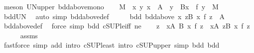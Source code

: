 \begin{isabellebody}
\ {\isacharparenleft}{\kern0pt}meson\ UN{\isacharunderscore}{\kern0pt}upper\ bdd{\isacharunderscore}{\kern0pt}above{\isacharunderscore}{\kern0pt}mono{\isacharparenright}{\kern0pt}\isanewline
\ \ \isamarkupfalse%
\ M\ \ {\isachardoublequoteopen}{\isasymAnd}x\ y{\isachardot}{\kern0pt}\ x\ {\isasymin}\ A\ {\isasymLongrightarrow}\ y\ {\isasymin}\ B{\isacharparenleft}{\kern0pt}x{\isacharparenright}{\kern0pt}\ {\isasymLongrightarrow}\ f\ y\ {\isasymle}\ M{\isachardoublequoteclose}\isanewline
\ \ \ \ \isamarkupfalse%
\ bdd{\isacharunderscore}{\kern0pt}UN\ \isamarkupfalse%
\ {\isacharparenleft}{\kern0pt}auto\ simp{\isacharcolon}{\kern0pt}\ bdd{\isacharunderscore}{\kern0pt}above{\isacharunderscore}{\kern0pt}def{\isacharparenright}{\kern0pt}\isanewline
\ \ \isamarkupfalse%
\ \isamarkupfalse%
\ bdd{}{\isacharcolon}{\kern0pt}\ {\isachardoublequoteopen}bdd{\isacharunderscore}{\kern0pt}above\ {\isacharparenleft}{\kern0pt}{\isacharparenleft}{\kern0pt}{\isasymlambda}x{\isachardot}{\kern0pt}\ {\isasymSqunion}z{\isasymin}B\ x{\isachardot}{\kern0pt}\ f\ z{\isacharparenright}{\kern0pt}\ {\isacharbackquote}{\kern0pt}\ A{\isacharparenright}{\kern0pt}{\isachardoublequoteclose}\isanewline
\ \ \ \ \isamarkupfalse%
\ bdd{\isacharunderscore}{\kern0pt}above{\isacharunderscore}{\kern0pt}def\ \isamarkupfalse%
\ {\isacharparenleft}{\kern0pt}force\ simp{\isacharcolon}{\kern0pt}\ bdd\ cSUP{\isacharunderscore}{\kern0pt}le{\isacharunderscore}{\kern0pt}iff\ ne{\isacharparenleft}{\kern0pt}{}{\isacharparenright}{\kern0pt}{\isacharparenright}{\kern0pt}\isanewline
\ \ \isamarkupfalse%
\ {\isachardoublequoteopen}{\isacharparenleft}{\kern0pt}{\isasymSqunion}z\ {\isasymin}\ {\isasymUnion}x{\isasymin}A{\isachardot}{\kern0pt}\ B\ x{\isachardot}{\kern0pt}\ f\ z{\isacharparenright}{\kern0pt}\ {\isasymle}\ {\isacharparenleft}{\kern0pt}{\isasymSqunion}x{\isasymin}A{\isachardot}{\kern0pt}\ {\isasymSqunion}z{\isasymin}B\ x{\isachardot}{\kern0pt}\ f\ z{\isacharparenright}{\kern0pt}{\isachardoublequoteclose}\isanewline
\ \ \ \ \isamarkupfalse%
\ assms\ \isamarkupfalse%
\ {\isacharparenleft}{\kern0pt}fastforce\ simp\ add{\isacharcolon}{\kern0pt}\ intro{\isacharbang}{\kern0pt}{\isacharcolon}{\kern0pt}\ cSUP{\isacharunderscore}{\kern0pt}least\ intro{\isacharcolon}{\kern0pt}\ cSUP{\isacharunderscore}{\kern0pt}upper{}\ simp{\isacharcolon}{\kern0pt}\ bdd{}\ bdd{\isacharparenright}{\kern0pt}\isanewline

\end{isabellebody}
